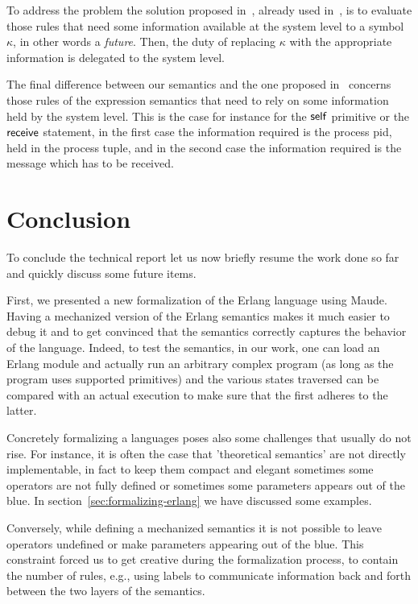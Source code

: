 \documentclass{article}[12pt,a4paper]
\theoremstyle{definition}
\begin{document}
To address the problem the solution proposed in~\cite{Gonzalez-AbrilV21},
already used in~\cite{LaneseNPV18}, is to evaluate those rules that need some information
available at the system level to a symbol $\kappa$, in other words a
\emph{future}. Then, the duty of replacing $\kappa$ with the
appropriate information is delegated to the system level.

The final difference between our semantics and the one proposed
in~\cite{Gonzalez-AbrilV21} concerns those rules of the expression semantics
that need to rely on some information held by the system level. This is the case
for instance for the $\mathsf{self}$ primitive or the $\mathsf{receive}$ statement, in
the first case the information required is the process pid, held in the process
tuple, and in the second case the information required is the message which has
to be received.



\section{Conclusion}\label{sec:conclusion}
To conclude the technical report let us now briefly resume the work done so far
and quickly discuss some future items.

First, we presented a new formalization of the Erlang language using Maude.
Having a mechanized version of the Erlang semantics makes it much easier to
debug it and to get convinced that the semantics correctly captures the
behavior of the language. Indeed, to test the semantics, in our work, one can
load an Erlang module and actually run an arbitrary complex program (as long as
the program uses supported primitives) and the various states traversed can be
compared with an actual execution to make sure that the first adheres to the
latter.

Concretely formalizing a languages poses also some challenges that
usually do not rise. For instance, it is often the case that 'theoretical
semantics' are not directly implementable, in fact to keep them compact and
elegant sometimes some operators are not fully defined or sometimes some
parameters appears out of the blue. In section~\ref{sec:formalizing-erlang} we
have discussed some examples.

Conversely, while defining a mechanized semantics it is not possible to leave
operators undefined or make parameters appearing out of the blue. This
constraint forced us to get creative during the formalization process, to
contain the number of rules, e.g., using labels to communicate information back
and forth between the two layers of the semantics.
\end{document}
